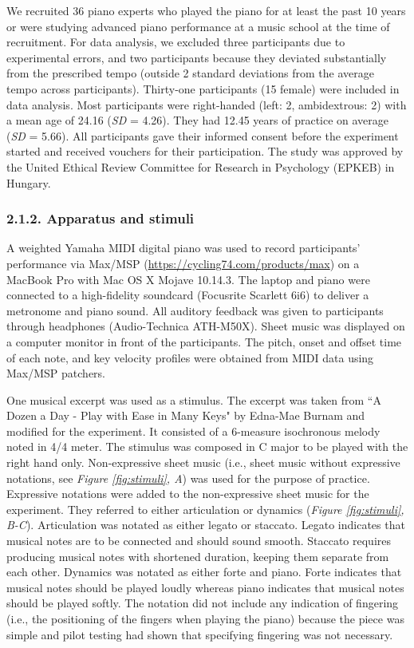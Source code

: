 \documentclass[
  english,
  man,floatsintext]{apa6}
\begin{document}
We recruited 36 piano experts who played the piano for at least the past 10 years or were studying advanced piano performance at a music school at the time of recruitment. For data analysis, we excluded three participants due to experimental errors, and two participants because they deviated substantially from the prescribed tempo (outside 2 standard deviations from the average tempo across participants). Thirty-one participants (15 female) were included in data analysis. Most participants were right-handed (left: 2, ambidextrous: 2) with a mean age of 24.16 (\emph{SD} = 4.26). They had 12.45 years of practice on average (\emph{SD} = 5.66). All participants gave their informed consent before the experiment started and received vouchers for their participation. The study was approved by the United Ethical Review Committee for Research in Psychology (EPKEB) in Hungary.

\hypertarget{apparatus-and-stimuli}{%
\subsubsection{2.1.2. Apparatus and stimuli}\label{apparatus-and-stimuli}}

A weighted Yamaha MIDI digital piano was used to record participants' performance via Max/MSP (\url{https://cycling74.com/products/max}) on a MacBook Pro with Mac OS X Mojave 10.14.3. The laptop and piano were connected to a high-fidelity soundcard (Focusrite Scarlett 6i6) to deliver a metronome and piano sound. All auditory feedback was given to participants through headphones (Audio-Technica ATH-M50X). Sheet music was displayed on a computer monitor in front of the participants. The pitch, onset and offset time of each note, and key velocity profiles were obtained from MIDI data using Max/MSP patchers.

One musical excerpt was used as a stimulus. The excerpt was taken from ``A Dozen a Day - Play with Ease in Many Keys" by Edna-Mae Burnam and modified for the experiment. It consisted of a 6-measure isochronous melody noted in 4/4 meter. The stimulus was composed in C major to be played with the right hand only. Non-expressive sheet music (i.e., sheet music without expressive notations, see \emph{Figure \ref{fig:stimuli}, A}) was used for the purpose of practice. Expressive notations were added to the non-expressive sheet music for the experiment. They referred to either articulation or dynamics (\emph{Figure \ref{fig:stimuli}, B-C}). Articulation was notated as either legato or staccato. Legato indicates that musical notes are to be connected and should sound smooth. Staccato requires producing musical notes with shortened duration, keeping them separate from each other. Dynamics was notated as either forte and piano. Forte indicates that musical notes should be played loudly whereas piano indicates that musical notes should be played softly. The notation did not include any indication of fingering (i.e., the positioning of the fingers when playing the piano) because the piece was simple and pilot testing had shown that specifying fingering was not necessary.
\end{document}
